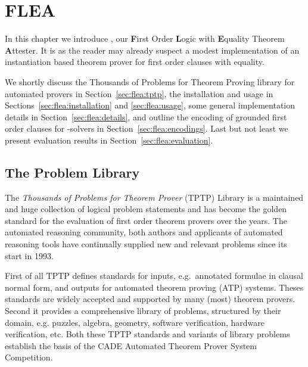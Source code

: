 
\chapter{FLEA}\label{chapter:flea}



In this chapter we introduce \FLEA{},
our
\textbf{F}irst Order \textbf{L}ogic with \textbf{E}quality Theorem \textbf{A}ttester.
It is
as the reader may already suspect
a modest implementation of an instantiation based theorem prover for first order clauses with equality. 

We shortly discuss the Thousands of Problems for Theorem Proving library for automated provers 
in Section~\vref{sec:flea:tptp},
the installation and usage in 
Sections~\vref{sec:flea:installation} and \vref{sec:flea:usage},
some general implementation details in Section~\vref{sec:flea:details}, 
and outline the encoding of grounded first order clauses for \SMT-solvers in Section~\vref{sec:flea:encodings}. 
Last but not least we present evaluation results in Section~\vref{sec:flea:evaluation}.

\section{The Problem Library}\label{sec:flea:tptp}

The \emph{Thousands of Problems for Theorem Prover} (TPTP) Library\cite{Sut17}
is a maintained and huge collection of logical problem statements and
has become the golden standard for the evaluation of first order theorem provers over the years.
The automated reasoning community, both authors and applicants of automated reasoning tools 
have continually supplied new and relevant problems since its start in 1993.

First of all TPTP defines standards for inputs, 
e.g.~annotated formulae in clausal normal form,
and outputs for automated theorem proving (ATP) systems. 
Theses standards are widely accepted and supported by many (most) theorem provers. 
Second it provides a comprehensive library of problems, structured by their domain,
e.g. puzzles, algebra, geometry, software verification, hardware verification, etc.
Both these TPTP standards and variants of library problems establish the basis of the CADE Automated Theorem Prover System Competition\cite{Sut16}.


